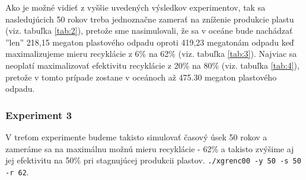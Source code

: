 \documentclass[a4paper, 11pt]{article}
\begin{document}
Ako je možné vidieť z vyššie uvedených výsledkov experimentov, tak sa nasledujúcich 50 rokov treba jednoznačne zamerať na zníženie produkcie plastu (viz. tabuľka \ref{tab:2}), pretože sme nasimulovali, že sa v oceáne bude nachádzať ''len'' 218,15 megaton plastového odpadu oproti 419,23 megatonám odpadu keď maximalizujeme mieru recyklácie z 6\% na 62\% (viz. tabuľka \ref{tab:3}). Najviac sa neoplatí maximalizovať efektivitu recyklácie z 20\% na 80\% (viz. tabuľka \ref{tab:4}), pretože v tomto prípade zostane v oceánoch až 475.30 megaton plastového odpadu.

\subsubsection{Experiment 3}
\label{label:exp3}

V treťom experimente budeme takisto simulovať časový úsek 50 rokov a zameráme sa na maximálnu možnú mieru recyklácie - 62\% a takisto zvýšime aj jej efektivitu na 50\% pri stagnujúcej produkcii plastov.
\texttt{./xgrenc00 -y 50 -s 50 -r 62}.
\end{document}
